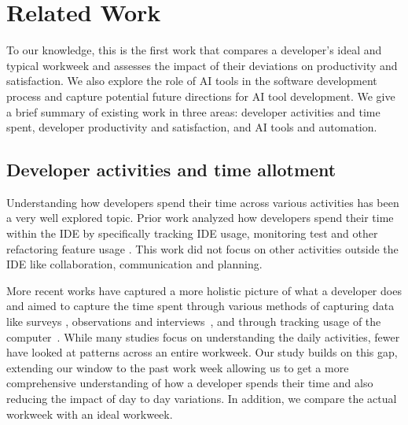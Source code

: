 \section{Related Work}
\label{sec:related_work}


To our knowledge, this is the first work that compares a developer's ideal and typical workweek and assesses the impact of their deviations on productivity and satisfaction. We also explore the role of AI tools in the software development process and capture potential future directions for AI tool development. We give a brief summary of existing work in three areas: developer activities and time spent, developer productivity and satisfaction, and AI tools and automation. 

\subsection{Developer activities and time allotment}
Understanding how developers spend their time across various activities has been a very well explored topic. Prior work analyzed how developers spend their time within the IDE by specifically tracking IDE usage, monitoring test and other refactoring feature usage \cite{i_know_what_you_did,vs_code_tracking}. This work did not focus on other activities outside the IDE like collaboration, communication and planning.

More recent works have captured a more holistic picture of what a developer does and aimed to capture the time spent through various methods of capturing data like surveys \cite{8666786,beller-software,activitiesTime2}, observations and interviews~\cite{gonccalves2011collaboration}, and through tracking usage of the computer~\cite{vs_code_tracking, i_know_what_you_did}. While many studies focus on understanding the daily activities, fewer have looked at patterns across an entire workweek. Our study builds on this gap, extending our window to the past work week allowing us to get a more comprehensive understanding of how a developer spends their time and also reducing the impact of day to day variations. In addition, we compare the actual workweek with an ideal workweek.


